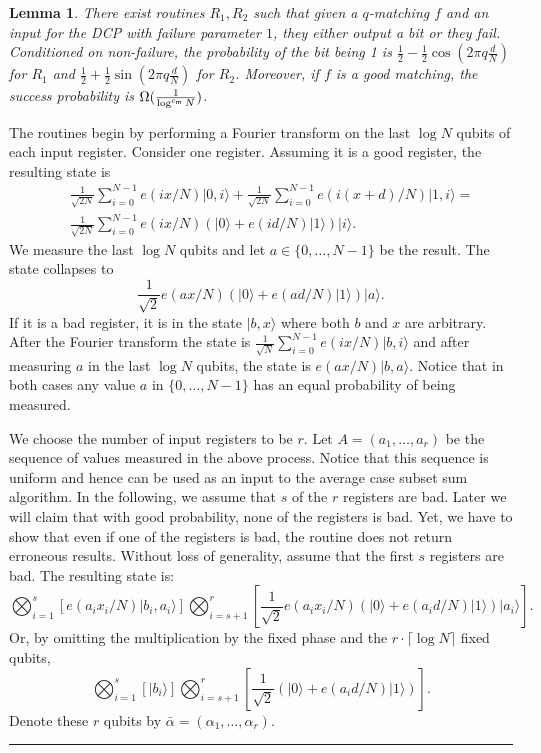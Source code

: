 \documentclass[11pt]{article}
\newtheorem{lemma}[theorem]{Lemma}
\newcommand{\qedsymb}{\hfill{\rule{2mm}{2mm}}}
\newenvironment{proof}{\begin{trivlist}
\item[\hspace{\labelsep}{\sl\noindent Proof:\/}]
}{\qedsymb\end{trivlist}}
\def\balpha{\bar{\alpha}}
\newcommand\ket[1]{{ |{#1} \rangle }}
\newcommand\C[1]{{ c_{\sf {#1}} }}
\newcommand\alternate[2]{{#1}}
\begin{document}
\begin{lemma}\label{routine_a}
There exist routines $R_1,R_2$ such that given a $q$-matching $f$ and an input for the DCP with failure parameter $1$,
they either output a bit or they fail. Conditioned on non-failure, the probability of the bit being 1 is
$\frac{1}{2}-\frac{1}{2}\cos(2\pi q \frac{d}{N})$ for $R_1$ and $\frac{1}{2}+\frac{1}{2}\sin(2\pi q \frac{d}{N})$ for
$R_2$. Moreover, if $f$ is a good matching, the success probability is $\Omega(\frac{1}{\log^{\C{m}}N})$.
\end{lemma}
\begin{proof}
The routines begin by performing a Fourier transform on the last $\log N$ qubits of each input register. Consider one
register. Assuming it is a good register, the resulting state is \alternate{
\begin{eqnarray*}
&&\frac{1}{\sqrt{2N}}\sum_{i=0}^{N-1}e(ix/N)\ket{0,i} + \frac{1}{\sqrt{2N}}\sum_{i=0}^{N-1}e(i(x+d)/N)\ket{1,i} =\\
&&\frac{1}{\sqrt{2N}}\sum_{i=0}^{N-1}e(ix/N)(\ket{0} + e(id/N)\ket{1})\ket{i} .
\end{eqnarray*}}{
$$\frac{1}{\sqrt{2N}}\sum_{i=0}^{N-1}e(ix/N)(\ket{0} + e(id/N)\ket{1})\ket{i} .$$
}
We measure the last $\log N$ qubits and let $a \in \{0,\ldots,N-1\}$ be the result. The state collapses to
$$ \frac{1}{\sqrt{2}}e(ax/N)(\ket{0} + e(ad/N)\ket{1})\ket{a} .$$
If it is a bad register, it is in the state $\ket{b,x}$ where both $b$ and $x$ are arbitrary. After the Fourier
transform the state is $\frac{1}{\sqrt{N}}\sum_{i=0}^{N-1}e(ix/N)\ket{b,i}$ and after measuring $a$ in the last $\log
N$ qubits, the state is $e(ax/N)\ket{b,a}$. Notice that in both cases any value $a$ in $\{0,\ldots,N-1\}$ has an equal
probability of being measured.

We choose the number of input registers to be $r$. Let $A=(a_1,\ldots,a_r)$ be the sequence of values measured in the
above process. Notice that this sequence is uniform and hence can be used as an input to the average case subset sum
algorithm. In the following, we assume that $s$ of the $r$ registers are bad. Later we will claim that with good
probability, none of the registers is bad. Yet, we have to show that even if one of the registers is bad, the routine
does not return erroneous results. Without loss of generality, assume that the first $s$ registers are bad. The
resulting state is\alternate{:
$$\bigotimes_{i=1}^{s}[e(a_i x_i/N)\ket{b_i,a_i}]\bigotimes_{i=s+1}^{r}[\frac{1}{\sqrt{2}}e(a_i x_i/N)(\ket{0} +
e(a_id/N)\ket{1})\ket{a_i}].$$ Or, by omitting the multiplication by the fixed phase and the $r\cdot \lceil\log
N\rceil$ fixed qubits,}{ (omitting a fixed phase and the fixed qubits): }
$$\bigotimes_{i=1}^{s}[\ket{b_i}]\bigotimes_{i=s+1}^{r}[\frac{1}{\sqrt{2}}(\ket{0} + e(a_id/N)\ket{1})].$$ Denote
these $r$ qubits by $\balpha = (\alpha_1,\ldots,\alpha_r)$.


\end{proof}
\end{document}
